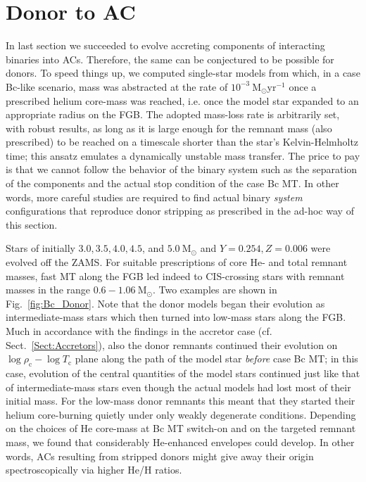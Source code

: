 \documentclass[a4paper,fleqn,usenatbib]{mnras}
\newcommand{\msol}{~\mathrm{M}_\odot}
\begin{document}
\section{Donor to AC}
In last section we succeeded to evolve accreting components of interacting binaries 
into ACs. Therefore, the same can be conjectured to be possible for donors. 
To speed things up, we computed single-star models from which, in a 
case Bc-like scenario, mass was abstracted at the rate of  $10^{-3} \msol \mathrm{yr}^{-1}$
once a prescribed helium core-mass was reached, 
i.e. once the model star expanded to an appropriate radius on the FGB. The adopted mass-loss rate 
is arbitrarily set, with robust results, as long as it is large enough for the remnant 
mass (also prescribed) to be reached on a
timescale shorter than the star's Kelvin-Helmholtz time; this ansatz emulates a dynamically 
unstable mass transfer. The price to pay is that we cannot follow the behavior of the binary system 
such as the separation of the components and the actual stop condition of the case Bc MT. 
In other words, more careful studies are required to find actual binary \emph{system} configurations 
that reproduce donor stripping as prescribed in the ad-hoc way of this section.

Stars of initially $3.0, 3.5, 4.0, 4.5$, and $5.0 \msol$ and $Y=0.254, Z=0.006$ 
were evolved off the ZAMS. For suitable prescriptions of core He- and total remnant masses, 
fast MT along the FGB led indeed to CIS-crossing stars with remnant masses 
in the range $0.6 - 1.06 \msol$. Two examples are shown in Fig.~\ref{fig:Bc_Donor}.
Note that the donor models began their evolution as intermediate-mass stars which then 
turned into low-mass stars along the FGB. Much in accordance with the 
findings in the accretor case (cf. Sect.~\ref{Sect:Accretors}), also the donor remnants continued 
their evolution on $\log \rho_{\mathrm{c}} - \log T_{\mathrm{c}}$ plane along the path of the model
star \emph{before} case Bc MT; in this case, evolution of the central quantities of the 
model stars continued just like that of intermediate-mass stars even though the actual models 
had lost most of their initial mass. For the low-mass donor remnants this meant that they 
started their helium core-burning quietly under only weakly degenerate conditions. 
Depending on the choices of He core-mass at Bc MT switch-on and on the targeted 
remnant mass, we found that considerably He-enhanced envelopes could develop. 
In other words, ACs resulting from stripped donors might give away their 
origin spectroscopically via higher He/H ratios.
\end{document}
